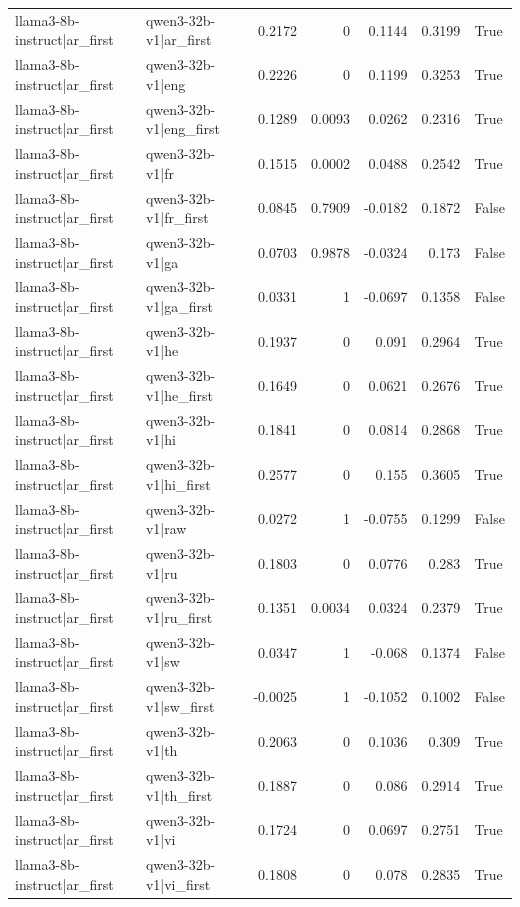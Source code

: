 \begin{table}
\begin{tabular}{l l r r r r l}
llama3-8b-instruct|ar_first & qwen3-32b-v1|ar_first & 0.2172 & 0 & 0.1144 & 0.3199 & True \\
llama3-8b-instruct|ar_first & qwen3-32b-v1|eng & 0.2226 & 0 & 0.1199 & 0.3253 & True \\
llama3-8b-instruct|ar_first & qwen3-32b-v1|eng_first & 0.1289 & 0.0093 & 0.0262 & 0.2316 & True \\
llama3-8b-instruct|ar_first & qwen3-32b-v1|fr & 0.1515 & 0.0002 & 0.0488 & 0.2542 & True \\
llama3-8b-instruct|ar_first & qwen3-32b-v1|fr_first & 0.0845 & 0.7909 & -0.0182 & 0.1872 & False \\
llama3-8b-instruct|ar_first & qwen3-32b-v1|ga & 0.0703 & 0.9878 & -0.0324 & 0.173 & False \\
llama3-8b-instruct|ar_first & qwen3-32b-v1|ga_first & 0.0331 & 1 & -0.0697 & 0.1358 & False \\
llama3-8b-instruct|ar_first & qwen3-32b-v1|he & 0.1937 & 0 & 0.091 & 0.2964 & True \\
llama3-8b-instruct|ar_first & qwen3-32b-v1|he_first & 0.1649 & 0 & 0.0621 & 0.2676 & True \\
llama3-8b-instruct|ar_first & qwen3-32b-v1|hi & 0.1841 & 0 & 0.0814 & 0.2868 & True \\
llama3-8b-instruct|ar_first & qwen3-32b-v1|hi_first & 0.2577 & 0 & 0.155 & 0.3605 & True \\
llama3-8b-instruct|ar_first & qwen3-32b-v1|raw & 0.0272 & 1 & -0.0755 & 0.1299 & False \\
llama3-8b-instruct|ar_first & qwen3-32b-v1|ru & 0.1803 & 0 & 0.0776 & 0.283 & True \\
llama3-8b-instruct|ar_first & qwen3-32b-v1|ru_first & 0.1351 & 0.0034 & 0.0324 & 0.2379 & True \\
llama3-8b-instruct|ar_first & qwen3-32b-v1|sw & 0.0347 & 1 & -0.068 & 0.1374 & False \\
llama3-8b-instruct|ar_first & qwen3-32b-v1|sw_first & -0.0025 & 1 & -0.1052 & 0.1002 & False \\
llama3-8b-instruct|ar_first & qwen3-32b-v1|th & 0.2063 & 0 & 0.1036 & 0.309 & True \\
llama3-8b-instruct|ar_first & qwen3-32b-v1|th_first & 0.1887 & 0 & 0.086 & 0.2914 & True \\
llama3-8b-instruct|ar_first & qwen3-32b-v1|vi & 0.1724 & 0 & 0.0697 & 0.2751 & True \\
llama3-8b-instruct|ar_first & qwen3-32b-v1|vi_first & 0.1808 & 0 & 0.078 & 0.2835 & True \\

\end{tabular}
\end{table}
